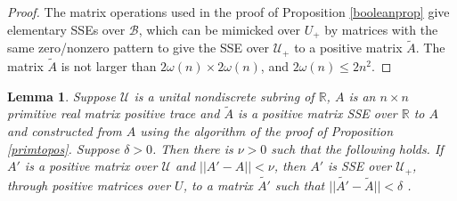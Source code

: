 \documentclass{amsart}
\newtheorem{lemma}[theorem]{Lemma}
\theoremstyle{definition}
\theoremstyle{remark}
\numberwithin{equation}{section}
\begin{document}
{{\begin{proof} 

The 
 matrix operations used in the proof 
of Proposition \ref{booleanprop} give   elementary SSEs 
over $\mathcal B$, 
which can be mimicked over $U_+$ by matrices with the same 
zero/nonzero pattern  
to give the SSE over $\mathcal U_+$ to a positive matrix 
$\widetilde A$.  
The matrix $\widetilde A$ is not larger than 
$2\omega(n)\times 2\omega(n)$, and 
$2\omega(n)\leq 2n^2 $. 
\end{proof} 

\begin{lemma}\label{pospos} 
Suppose $\mathcal U$ is a unital nondiscrete subring 
of $\mathbb R$, $A$ is an $n\times n$  primitive 
real matrix positive trace and 
$\widetilde A$ is a positive matrix 
SSE over  $\mathbb R$ to $A$ and 
constructed from $A$ using the algorithm of the proof 
of Proposition \ref{primtopos}. 
Suppose $\delta >0$. 
Then there is $\nu >0$ such that the following holds. 
If $A'$ is a positive matrix over $\mathcal U$ and $||A'-A||< \nu$, 
then $A'$ is SSE over $\mathcal U_+$, through positive matrices over 
 $U$, to a matrix $\widetilde{A'}$
such that  $||\widetilde{A'}-\widetilde{A}||< \delta$ .
\end{lemma} 

}}
\end{document}

